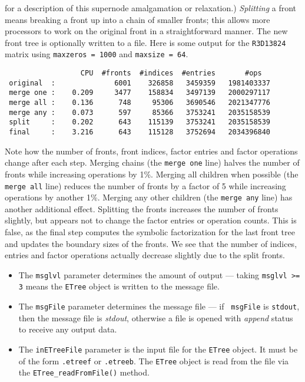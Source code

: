 \begin{enumerate}
for a description of this supernode amalgamation or relaxation.)
{\it Splitting} a front means breaking a front up into a chain of
smaller fronts; this allows more processors to work on the original
front in a straightforward manner.
The new front tree is optionally written to a file.
Here is some output for the {\tt R3D13824} matrix using
{\tt maxzeros = 1000} and {\tt maxsize = 64}.
\begin{verbatim}
                  CPU  #fronts  #indices  #entries       #ops
 original  :              6001    326858   3459359   1981403337 
 merge one :    0.209     3477    158834   3497139   2000297117 
 merge all :    0.136      748     95306   3690546   2021347776 
 merge any :    0.073      597     85366   3753241   2035158539 
 split     :    0.202      643    115139   3753241   2035158539 
 final     :    3.216      643    115128   3752694   2034396840 
\end{verbatim}
Note how the number of fronts, front indices, factor entries and
factor operations change after each step.
Merging chains (the {\tt merge one} line) halves 
the number of fronts while increasing operations by 1\%.
Merging all children when possible 
(the {\tt merge all} line)
reduces the number of fronts by a factor of 5 
while increasing operations by another 1\%.
Merging any other children (the {\tt merge any} line)
has another additional effect.
Splitting the fronts increases the number of fronts slightly, 
but appears not to change the factor entries or operation counts. 
This is false, as the final step computes the symbolic
factorization for the last front tree and updates the boundary
sizes of the fronts. 
We see that the number of indices, entries and factor operations 
actually decrease slightly due to the split fronts.
\par
\begin{itemize}
\item
The {\tt msglvl} parameter determines the amount of output ---
taking {\tt msglvl >= 3} means the {\tt ETree} object is written
to the message file.
\item
The {\tt msgFile} parameter determines the message file --- if {\tt
msgFile} is {\tt stdout}, then the message file is {\it stdout},
otherwise a file is opened with {\it append} status to receive any
output data.
\item
The {\tt inETreeFile} parameter is the input file for the {\tt ETree}
object. It must be of the form {\tt *.etreef} or {\tt *.etreeb}.
The {\tt ETree} object is read from the file via the
{\tt ETree\_readFromFile()} method.

\end{itemize}
\end{enumerate}
